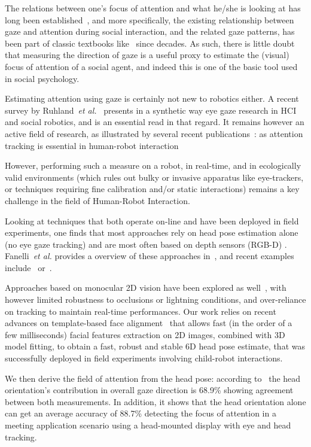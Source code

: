 \documentclass{sig-alternate}
\newcommand{\etal}{\textit{et al.}\xspace}
\begin{document}
The relations between one's focus of attention and what he/she is looking at has
long been established~\cite{yarbus1967eye,barber1976perception}, and more
specifically, the existing relationship between gaze and attention during social
interaction, and the related gaze patterns, has been part of classic textbooks
like~\cite{argyle1969social} since decades. As such, there is little doubt that
measuring the direction of gaze is a useful proxy to estimate the (visual) focus
of attention of a social agent, and indeed this is one of the basic tool used in
social psychology.

Estimating attention using gaze is certainly not new to robotics either. A
recent survey by Ruhland~\etal~\cite{ruhland2015review} presents in a synthetic
way eye gaze research in HCI and social robotics, and is an essential read in
that regard. It remains however an active field of research, as illustrated by
several recent publications~\cite{baxter2014tracking,anzalone,kennedy2015head}:
as attention tracking is essential in human-robot interaction

However, performing such a measure on a robot, in real-time, and in ecologically
valid environments (which rules out bulky or invasive apparatus like
eye-trackers, or techniques requiring fine calibration and/or static
interactions) remains a key challenge in the field of Human-Robot Interaction.

Looking at techniques that both operate on-line and have been deployed in field
experiments, one finds that most approaches rely on head pose estimation alone
(no eye gaze tracking) and are most often based on depth sensors (RGB-D) .
Fanelli~\etal provides a overview of these approaches in~\cite{fanelli2012real},
and recent examples include~\cite{baxter2014tracking} or~\cite{anzalone}.

Approaches based on monocular 2D vision have been explored as
well~\cite{peters2010investigating}, with however limited robustness to
occlusions or lightning conditions, and over-reliance on tracking to maintain
real-time performances.  Our work relies on recent advances on template-based
face alignment~\cite{kazemi2014one} that allows fast (in the order of a few
milliseconds) facial features extraction on 2D images, combined with 3D model
fitting, to obtain a fast, robust and stable 6D head pose estimate, that was
successfully deployed in field experiments involving child-robot interactions.

We then derive the field of attention from the head pose: according
to~\cite{stiefelhagen2002tracking} the head orientation's contribution in
overall gaze direction is 68.9\% showing agreement between both measurements.
In addition, it shows that the head orientation alone can get an average
accuracy of 88.7\% detecting the focus of attention in a meeting application
scenario using a head-mounted display with eye and head tracking.
\end{document}
